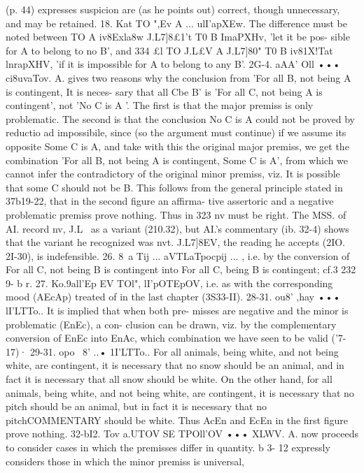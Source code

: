 {{{{{(p. 44) expresses suspicion are (as he points out) correct, though
unnecessary, and may be retained.
18. Kat TO ",Ev A ... ulI'apXEw. The difference must be noted
between TO A iv8Exla8w J.L7]8£1't T0 B ImaPXHv, 'let it be pos-
sible for A to belong to no B', and 334 £l TO J.L£V A J.L7]80" T0 B
iv81X!Tat lnrapXHV, 'if it is impossible for A to belong to any B'.
2G-4. aAA' Oll ••• ci8uvaTov. A. gives two reasons why the
conclusion from 'For all B, not being A is contingent, It is neces-
sary that all Cbe B' is 'For all C, not being A is contingent', not
'No C is A '. The first is that the major premiss is only problematic.
The second is that the conclusion No C is A could not be proved
by reductio ad impossibile, since (so the argument must continue)
if we assume its opposite Some C is A, and take with this the
original major premiss, we get the combination 'For all B, not
being A is contingent, Some C is A', from which we cannot infer
the contradictory of the original minor premiss, viz. It is possible
that some C should not be B. This follows from the general
principle stated in 37b19-22, that in the second figure an affirma-
tive assertoric and a negative problematic premiss prove nothing.
Thus in 323 nv{ must be right. The MSS. of AI. record nv, J.L~
as a variant (210.32), but AI.'s commentary (ib. 32-4) shows that
the variant he recognized was nvt. J.L7]8EV{, the reading he accepts
(2IO. 2I-30), is indefensible.
26. 8~a Tij ... aVTLaTpocpij ... , i.e. by the conversion of For all C,
not being B is contingent into For all C, being B is contingent;
cf.3 232 9- b r.
27. Ko.9all'Ep EV TOl", lI'pOTEpOV, i.e. as with the corresponding
mood (AEcAp) treated of in the last chapter (3S33-II).
28-31. ou8' ,hay ••• lI'LTTo.. It is implied that when both pre-
misses are negative and the minor is problematic (EnEc), a con-
clusion can be drawn, viz. by the complementary conversion of
EnEc into EnAc, which combination we have seen to be valid
('7-17)·
29-31. opo~ 8' ..• 1I'LTTo.. For all animals, being white, and
not being white, are contingent, it is necessary that no snow
should be an animal, and in fact it is necessary that all snow
should be white. On the other hand, for all animals, being white,
and not being white, are contingent, it is necessary that no pitch
should be an animal, but in fact it is necessary that no pitchCOMMENTARY
should be white. Thus AcEn and EcEn in the first figure prove
nothing.
32-bI2. Tov a.UTOV SE TPOll'OV ••• XLWV. A. now proceeds to
consider cases in which the premisses differ in quantity. b 3- 12
expressly considers those in which the minor premiss is universal,
}}}}}}}
